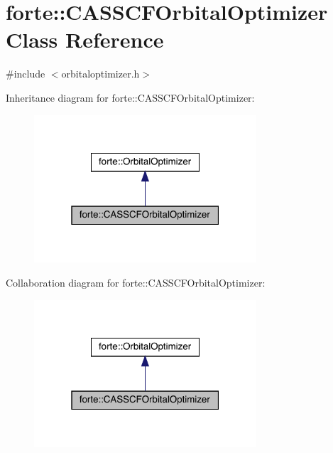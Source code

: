 \hypertarget{classforte_1_1_c_a_s_s_c_f_orbital_optimizer}{}\section{forte\+:\+:C\+A\+S\+S\+C\+F\+Orbital\+Optimizer Class Reference}
\label{classforte_1_1_c_a_s_s_c_f_orbital_optimizer}


{\ttfamily \#include $<$orbitaloptimizer.\+h$>$}



Inheritance diagram for forte\+:\+:C\+A\+S\+S\+C\+F\+Orbital\+Optimizer\+:
\nopagebreak
\begin{figure}[H]
\begin{center}
\leavevmode
\includegraphics[width=235pt]{classforte_1_1_c_a_s_s_c_f_orbital_optimizer__inherit__graph}
\end{center}
\end{figure}


Collaboration diagram for forte\+:\+:C\+A\+S\+S\+C\+F\+Orbital\+Optimizer\+:
\nopagebreak
\begin{figure}[H]
\begin{center}
\leavevmode
\includegraphics[width=235pt]{classforte_1_1_c_a_s_s_c_f_orbital_optimizer__coll__graph}
\end{center}
\end{figure}
